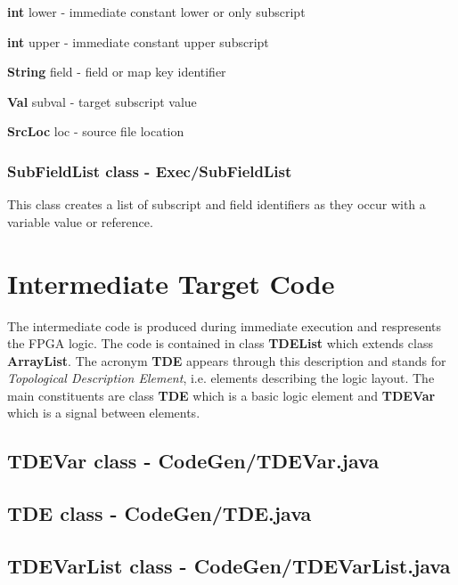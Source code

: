 \documentclass[10pt,a4paper,twoside,fleqn]{book}
\begin{document}
            {\bf int} lower - immediate constant lower or only subscript
            
            {\bf int} upper - immediate constant upper subscript
            
            {\bf String} field - field or map key identifier
            
            {\bf Val} subval - target subscript value
            
            {\bf SrcLoc} loc - source file location


        \subsection{SubFieldList class - Exec/SubFieldList}\label{subfieldlist}

            This class creates a list of subscript and field identifiers as they occur
            with a variable value or reference.
 




        
        
\chapter{Intermediate Target Code}

    The intermediate code is produced during immediate execution and
    respresents the FPGA logic. The code is contained in class {\bf TDEList}
    which extends class {\bf ArrayList}. The acronym {\bf TDE} appears
    through this description and stands for {\em Topological Description
    Element}, i.e. elements describing the logic layout. The main
    constituents are class {\bf TDE} which is a basic logic element and
    {\bf TDEVar} which is a signal between elements.



    \section{TDEVar class - CodeGen/TDEVar.java}

        


    \section{TDE class - CodeGen/TDE.java}

        
        

    \section{TDEVarList class - CodeGen/TDEVarList.java}
\end{document}
